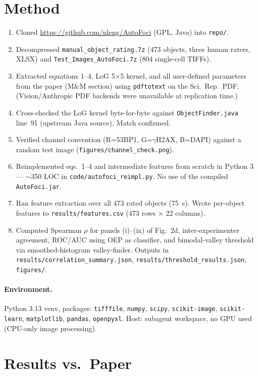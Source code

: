 \documentclass[11pt]{article}
\begin{document}
\section{Method}
\begin{enumerate}
\item Cloned \url{https://github.com/nleng/AutoFoci} (GPL, Java) into \texttt{repo/}.
\item Decompressed \texttt{manual\_object\_rating.7z} (473 objects, three human raters, XLSX) and \texttt{Test\_Images\_AutoFoci.7z} (804 single-cell TIFFs).
\item Extracted equations 1--4, LoG 5$\times$5 kernel, and all user-defined parameters from the paper (M\&M section) using \texttt{pdftotext} on the Sci.\ Rep.\ PDF. (Vision/Anthropic PDF backends were unavailable at replication time.)
\item Cross-checked the LoG kernel byte-for-byte against \texttt{ObjectFinder.java} line~91 (upstream Java source). Match confirmed.
\item Verified channel convention (R=53BP1, G=$\gamma$H2AX, B=DAPI) against a random test image (\texttt{figures/channel\_check.png}).
\item Reimplemented eqs.~1--4 and intermediate features from scratch in Python 3 --- $\sim$350 LOC in \texttt{code/autofoci\_reimpl.py}. No use of the compiled \texttt{AutoFoci.jar}.
\item Ran feature extraction over all 473 rated objects (75~s). Wrote per-object features to \texttt{results/features.csv} (473 rows $\times$ 22 columns).
\item Computed Spearman $\rho$ for panels (i)--(ix) of Fig.~2d, inter-experimenter agreement, ROC/AUC using OEP as classifier, and bimodal-valley threshold via smoothed-histogram valley-finder. Outputs in \texttt{results/correlation\_summary.json}, \texttt{results/threshold\_results.json}, \texttt{figures/}.
\end{enumerate}

\paragraph{Environment.} Python 3.13 venv, packages: \texttt{tifffile}, \texttt{numpy}, \texttt{scipy}, \texttt{scikit-image}, \texttt{scikit-learn}, \texttt{matplotlib}, \texttt{pandas}, \texttt{openpyxl}. Host: subagent workspace, no GPU used (CPU-only image processing).

\section{Results vs.\ Paper}
\end{document}
